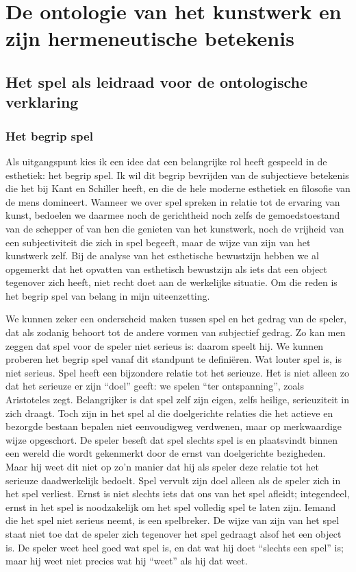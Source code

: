 \chapter{De ontologie van het kunstwerk en zijn hermeneutische betekenis}

\section{Het spel als leidraad voor de ontologische verklaring}

\subsection{Het begrip spel}

Als uitgangspunt kies ik een idee dat een belangrijke rol heeft gespeeld in de esthetiek: het begrip spel. Ik wil dit begrip bevrijden van de subjectieve betekenis die het bij Kant en Schiller heeft, en die de hele moderne esthetiek en filosofie van de mens domineert. Wanneer we over spel spreken in relatie tot de ervaring van kunst, bedoelen we daarmee noch de gerichtheid noch zelfs de gemoedstoestand van de schepper of van hen die genieten van het kunstwerk, noch de vrijheid van een subjectiviteit die zich in spel begeeft, maar de wijze van zijn van het kunstwerk zelf. Bij de analyse van het esthetische bewustzijn hebben we al opgemerkt dat het opvatten van esthetisch bewustzijn als iets dat een object tegenover zich heeft, niet recht doet aan de werkelijke situatie. Om die reden is het begrip spel van belang in mijn uiteenzetting.

We kunnen zeker een onderscheid maken tussen spel en het gedrag van de speler, dat als zodanig behoort tot de andere vormen van subjectief gedrag. Zo kan men zeggen dat spel voor de speler niet serieus is: daarom speelt hij. We kunnen proberen het begrip spel vanaf dit standpunt te definiëren. Wat louter spel is, is niet serieus. Spel heeft een bijzondere relatie tot het serieuze. Het is niet alleen zo dat het serieuze er zijn ``doel'' geeft: we spelen ``ter ontspanning'', zoals Aristoteles zegt. Belangrijker is dat spel zelf zijn eigen, zelfs heilige, serieuziteit in zich draagt. Toch zijn in het spel al die doelgerichte relaties die het actieve en bezorgde bestaan bepalen niet eenvoudigweg verdwenen, maar op merkwaardige wijze opgeschort. De speler beseft dat spel slechts spel is en plaatsvindt binnen een wereld die wordt gekenmerkt door de ernst van doelgerichte bezigheden. Maar hij weet dit niet op zo'n manier dat hij als speler deze relatie tot het serieuze daadwerkelijk bedoelt. Spel vervult zijn doel alleen als de speler zich in het spel verliest. Ernst is niet slechts iets dat ons van het spel afleidt; integendeel, ernst in het spel is noodzakelijk om het spel volledig spel te laten zijn. Iemand die het spel niet serieus neemt, is een spelbreker. De wijze van zijn van het spel staat niet toe dat de speler zich tegenover het spel gedraagt alsof het een object is. De speler weet heel goed wat spel is, en dat wat hij doet ``slechts een spel'' is; maar hij weet niet precies wat hij ``weet'' als hij dat weet.

